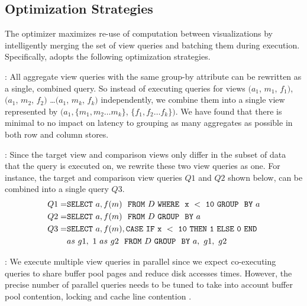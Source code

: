 \subsection{Optimization Strategies}

The \SeeDB optimizer maximizes re-use of computation between
visualizations by intelligently merging the set of view queries and batching them during execution.
Specifically, \SeeDB adopts the following optimization strategies.

: All aggregate view queries 
with the same group-by attribute can be 
rewritten as a single, combined query. So instead of executing
queries for views $(a_1$, $m_1$, $f_1)$, $(a_1$, $m_2$, $f_2)$ \ldots $(a_1$, $m_k$, $f_k)$
independently, we combine them into a single view represented by
$(a_1, \{m_1, m_2\ldots m_k\}$, $\{f_1, f_2\ldots f_k\})$.  
We have found that there is minimal to no impact on latency 
to grouping as many aggregates as possible in both row and column stores. 

:
Since the target view and comparison views only differ in the subset of data
that the query is executed on, we rewrite these two view queries as
one. For instance, the target and comparison view queries $Q1$ and $Q2$
shown below, can be combined into a single query $Q3$.
\vspace{-5pt}
\begin{align*} 
Q1 = &{\tt SELECT \ } a, f(m) \ \ {\tt FROM} \  D\  {\tt WHERE \ \ x\ <\ 10\
GROUP \ \ BY} \ a \\
Q2 = &{\tt SELECT \ } a, f(m) \ \ {\tt FROM} \  D\  {\tt GROUP \ \ BY} \ a \\
Q3 = &{\tt SELECT \ } a, f(m), {\tt CASE\ IF\ x\ <\ 10\ THEN\ 1\ ELSE\ 0\
END}\\ 
&as\ g1,\ 1\ as\ g2 \ \ {\tt FROM} \ D\ {\tt GROUP \ \ BY} \ a,\ g1,\ g2
\end{align*}

:
  We execute multiple view queries in parallel since we expect co-executing queries 
  to share buffer pool pages and reduce disk accesses times. 
  However, the precise number of parallel queries needs to be tuned to take into account 
  buffer pool contention, locking and cache line contention \cite{Postgres_wiki}. 

